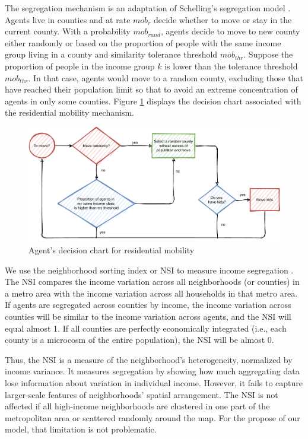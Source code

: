 The segregation mechanism is an adaptation of Schelling's segregation model \citep{schelling2006}. Agents live in counties and at rate $mob_r$ decide whether to move or stay in the current county. With a probability $mob_{rand}$, agents decide to move to new county either randomly or based on the proportion of people with the same income group living in a county and similarity tolerance threshold $mob_{thr}$. Suppose the proportion of people in the income group $k$ is lower than the tolerance threshold $mob_{thr}$. In that case, agents would move to a random county, excluding those that have reached their population limit so that to avoid an extreme concentration of agents in only some counties. Figure \ref{ch04:action_chart_residential_mobility} displays the decision chart associated with the residential mobility mechanism.

\newpage
\begin{figure}[htp]
    \caption{Agent's decision chart for residential mobility} \label{ch04:action_chart_residential_mobility}
    \centering
        \includegraphics[scale=0.8]{plots/action-chart-residential-mobility.pdf}
\end{figure}

We use the neighborhood sorting index or NSI to measure income segregation \citep{jargowsky2005}. The NSI compares the income variation across all neighborhoods (or counties) in a metro area with the income variation across all households in that metro area. If agents are segregated across counties by income, the income variation across counties will be similar to the income variation across agents, and the NSI will equal almost 1. If all counties are perfectly economically integrated (i.e., each county is a microcosm of the entire population), the NSI will be almost 0.

Thus, the NSI is a measure of the neighborhood's heterogeneity, normalized by income variance. It measures segregation by showing how much aggregating data lose information about variation in individual income. However, it fails to capture larger-scale features of neighborhoods' spatial arrangement. The NSI is not affected if all high-income neighborhoods are clustered in one part of the metropolitan area or scattered randomly around the map. For the propose of our model, that limitation is not problematic.

